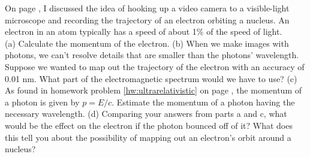 On page \pageref{video-electron}, I discussed the idea of hooking up a video
camera to a visible-light microscope and recording the trajectory of an
electron orbiting a nucleus. An electron in an atom typically has a speed
of about 1\% of the speed of light.\\
(a) Calculate the momentum of the electron.\answercheck\hwendpart
(b) When we make images with photons, we can't resolve details that are smaller than
the photons' wavelength. Suppose we wanted to map out the trajectory of the electron
with an accuracy of 0.01 nm. What part of the electromagnetic spectrum would we have
to use?\hwendpart
(c)  As found in homework problem \ref{hw:ultrarelativistic} on page \pageref{hw:ultrarelativistic},
the momentum of a photon is given by $p=E/c$. Estimate the momentum of a photon having
the necessary wavelength.\answercheck\hwendpart
(d) Comparing your answers from parts a and c, what would be the effect on the electron if
the photon bounced off of it?
What does this tell you about the possibility of mapping out an electron's orbit around
a nucleus?\hwendpart
